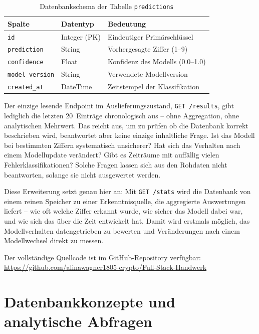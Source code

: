 \documentclass[12pt, a4paper]{article}
\begin{document}
\begin{table}[h]
\centering
\caption{Datenbankschema der Tabelle \texttt{predictions}}
\label{tab:schema}
\begin{tabular}{llp{7cm}}
  \toprule
  \textbf{Spalte} & \textbf{Datentyp} & \textbf{Bedeutung} \\
  \midrule
  \texttt{id}             & Integer (PK)  & Eindeutiger Primärschlüssel \\
  \texttt{prediction}     & String        & Vorhergesagte Ziffer (1--9) \\
  \texttt{confidence}     & Float         & Konfidenz des Modells (0.0--1.0) \\
  \texttt{model\_version} & String        & Verwendete Modellversion \\
  \texttt{created\_at}    & DateTime      & Zeitstempel der Klassifikation \\
  \bottomrule
\end{tabular}
\end{table}

Der einzige lesende Endpoint im Auslieferungszustand, \texttt{GET /results},
gibt lediglich die letzten 20~Einträge chronologisch aus -- ohne
Aggregation, ohne analytischen Mehrwert. Das reicht aus, um zu prüfen ob
die Datenbank korrekt beschrieben wird, beantwortet aber keine einzige
inhaltliche Frage. Ist das Modell bei bestimmten Ziffern systematisch
unsicherer? Hat sich das Verhalten nach einem Modellupdate verändert? Gibt
es Zeiträume mit auffällig vielen Fehlerklassifikationen? Solche Fragen
lassen sich aus den Rohdaten nicht beantworten, solange sie nicht
ausgewertet werden.

Diese Erweiterung setzt genau hier an: Mit \texttt{GET /stats} wird die
Datenbank von einem reinen Speicher zu einer Erkenntnisquelle, die
aggregierte Auswertungen liefert -- wie oft welche Ziffer erkannt wurde,
wie sicher das Modell dabei war, und wie sich das über die Zeit entwickelt
hat. Damit wird erstmals möglich, das Modellverhalten datengetrieben zu
bewerten und Veränderungen nach einem Modellwechsel direkt zu messen. 

Der vollständige Quellcode ist im GitHub-Repository verfügbar:\\
\url{https://github.com/alinawagner1805-crypto/Full-Stack-Handwerk}

\section{Datenbankkonzepte und analytische Abfragen}
\end{document}
